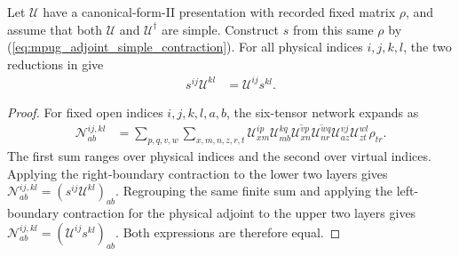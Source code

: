 \begin{lemma}
    \label{thm:mpug_adjoint_simple_cross_product}
    \leanok
    Let $\mathcal U$ have a canonical-form-II presentation with recorded
    fixed matrix $\rho$, and assume that both $\mathcal U$ and
    $\mathcal U^\dagger$ are simple. Construct $s$ from this same $\rho$
    by (\ref{eq:mpug_adjoint_simple_contraction}). For all physical
    indices $i,j,k,l$, the two reductions in
    \cite[lines~1164--1254]{FrancoRubio2025MPUGauging} give
    \begin{align}
        s^{ij}\mathcal U^{kl} & =\mathcal U^{ij}s^{kl}.
        \label{eq:mpug_adjoint_simple_cross_product}
    \end{align}
\end{lemma}

\begin{proof}\leanok
    For fixed open indices $i,j,k,l,a,b$, the six-tensor network expands as
    \begin{align}
        \mathcal N^{ij,kl}_{ab}
         & =\sum_{p,q,v,w}\sum_{x,m,n,z,r,t}
        \mathcal U^{ip}_{xm}\mathcal U^{kq}_{mb}
        \overline{\mathcal U^{vp}_{xn}}
        \overline{\mathcal U^{wq}_{nr}}
        \mathcal U^{vj}_{az}\mathcal U^{wl}_{zt}\rho_{tr}.
    \end{align}
    The first sum ranges over physical indices and the second over virtual
    indices. Applying the right-boundary contraction to the lower two
    layers gives $\mathcal N^{ij,kl}_{ab}=(s^{ij}\mathcal U^{kl})_{ab}$.
    Regrouping the same finite sum and applying the left-boundary
    contraction for the physical adjoint to the upper two layers gives
    $\mathcal N^{ij,kl}_{ab}=(\mathcal U^{ij}s^{kl})_{ab}$.
    Both expressions are therefore equal.
\end{proof}

